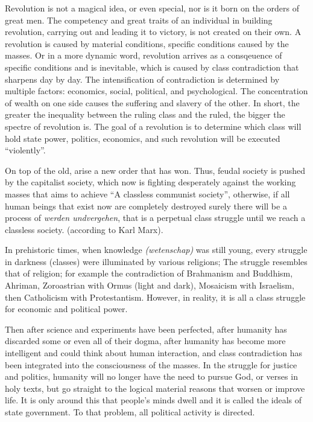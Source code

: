 Revolution is not a magical idea, or even special, nor is it born on the orders of great men. 
The competency and great traits of an individual in building revolution, carrying out and leading it to 
victory, is not created on their own. A revolution is caused by material conditions, specific conditions 
caused by the masses. Or in a more dynamic word, revolution arrives as a consqeuence of specific conditions and is inevitable, 
which is caused by class contradiction that sharpens day by day. The intensification of contradiction is 
determined by multiple factors: economics, social, political, and psychological. The concentration of wealth on 
one side causes the suffering and slavery of the other. In short, the greater the inequality between the ruling 
class and the ruled, the bigger the spectre of revolution is. The goal of a revolution is to determine which class 
will hold state power, politics, economics, and such revolution will be executed “violently”.\nline

On top of the old, arise a new order that has won. Thus, feudal society is pushed by the capitalist 
society, which now is fighting desperately against the working masses that aims to achieve “A classless communist society”, 
otherwise, if all human beings that exist now are completely destroyed surely there will be a process of \emph{werden undvergehen}, 
that is a perpetual class struggle until we reach a classless society. (according to Karl Marx).\nline

In prehistoric times, when knowledge \emph{(wetenschap)} was still young, every struggle in darkness (classes) were illuminated
by various religions; The struggle resembles that of religion; for example the contradiction of Brahmanism 
and Buddhism, Ahriman, Zoroastrian with Ormus (light and dark), Mosaicism with Israelism, then Catholicism with Protestantism. 
However, in reality, it is all a class struggle for economic and political power.\nline

Then after science and experiments have been perfected, after humanity has discarded some or even all of their dogma, 
after humanity has become more intelligent and could think about human interaction, and class contradiction has 
been integrated into the consciousness of the masses. In the struggle for justice and politics, humanity will no 
longer have the need to pursue God, or verses in holy texts, but go straight to the logical material reasons that 
worsen or improve life. It is only around this that people's minds dwell and it is called the ideals of state government. 
To that problem, all political activity is directed.\nline

